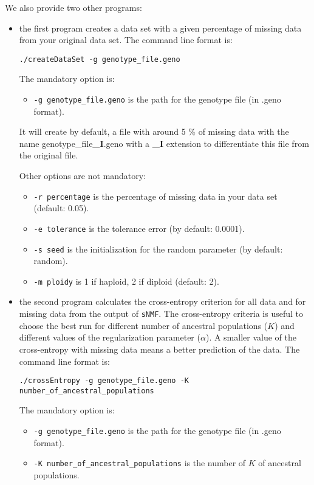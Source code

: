 \documentclass[10pt,a4paper]{article}
\begin{document}
We also provide two other programs:
\begin{itemize}
\item the first program creates a data set with a given percentage of missing data from your original data set.
The command line format is:
\begin{Verbatim}[frame=single]
./createDataSet -g genotype_file.geno
\end{Verbatim}

The mandatory option is:
\begin{itemize}
\item \verb|-g genotype_file.geno| is the path for the genotype file (in .geno format).
\end{itemize}

It will create by default, a file with around 5 \% of missing data with the name genotype\_file{\bf\_I}.geno with a {\bf\_I} extension to differentiate this file from the original file. 

\noindent
Other options are not mandatory:
\begin{itemize}
\item \verb|-r percentage| is the percentage of missing data in your data set (default: 0.05). 
\item \verb|-e tolerance| is the tolerance error (by default: 0.0001). 
\item \verb|-s seed| is the initialization for the random parameter (by default: random). 
\item \verb|-m ploidy| is 1 if haploid, 2 if diploid (default: 2). 
\end{itemize}

\item the second program calculates the cross-entropy criterion for all data and for missing data from the 
output of {\tt sNMF}. The cross-entropy criteria is useful to choose the best run for different number of 
ancestral populations ($K$) and different values of the regularization parameter ($\alpha$). A smaller value
of the cross-entropy with missing data means a better prediction of the data.
The command line format is:
\begin{Verbatim}[frame=single]
./crossEntropy -g genotype_file.geno -K number_of_ancestral_populations
\end{Verbatim}

The mandatory option is:
\begin{itemize}
\item \verb|-g genotype_file.geno| is the path for the genotype file (in .geno format).
\item \verb|-K number_of_ancestral_populations| is the number of $K$ of ancestral populations.
\end{itemize}


\end{itemize}
\end{document}
